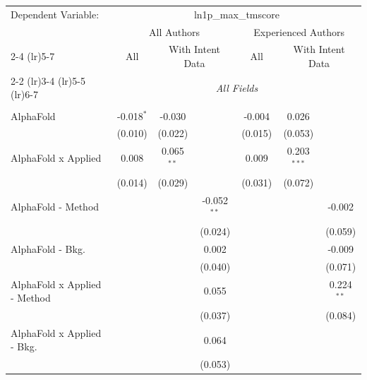 \begingroup
\centering
\begin{tabular}{lcccccc}
   \tabularnewline \midrule \midrule
   Dependent Variable: & \multicolumn{6}{c}{ln1p\_max\_tmscore}\\
 & \multicolumn{3}{c}{All Authors} & \multicolumn{3}{c}{Experienced Authors} \\
\cmidrule(lr){2-4} \cmidrule(lr){5-7}
 & \multicolumn{1}{c}{All} & \multicolumn{2}{c}{With Intent Data} & \multicolumn{1}{c}{All} & \multicolumn{2}{c}{With Intent Data} \\
\cmidrule(lr){2-2} \cmidrule(lr){3-4} \cmidrule(lr){5-5} \cmidrule(lr){6-7}
 & \multicolumn{6}{c}{\textit{All Fields}} \\ \\
   AlphaFold                      & -0.018$^{*}$ & -0.030       &               & -0.004  & 0.026         &   \\   
                                  & (0.010)      & (0.022)      &               & (0.015) & (0.053)       &   \\   
   AlphaFold x Applied            & 0.008        & 0.065$^{**}$ &               & 0.009   & 0.203$^{***}$ &   \\   
                                  & (0.014)      & (0.029)      &               & (0.031) & (0.072)       &   \\   
   AlphaFold - Method             &              &              & -0.052$^{**}$ &         &               & -0.002\\   
                                  &              &              & (0.024)       &         &               & (0.059)\\   
   AlphaFold - Bkg.               &              &              & 0.002         &         &               & -0.009\\   
                                  &              &              & (0.040)       &         &               & (0.071)\\   
   AlphaFold x Applied - Method   &              &              & 0.055         &         &               & 0.224$^{**}$\\   
                                  &              &              & (0.037)       &         &               & (0.084)\\   
   AlphaFold x Applied - Bkg.     &              &              & 0.064         &         &               &   \\   
                                  &              &              & (0.053)       &         &               &   \\   

\end{tabular}
